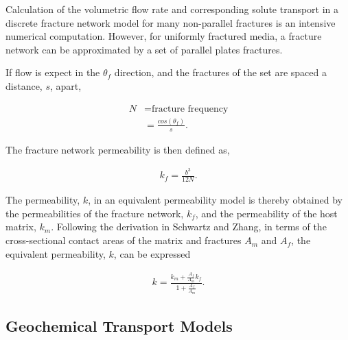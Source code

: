 Calculation of the volumetric flow rate and corresponding solute transport in a
discrete fracture network model for many non-parallel fractures is an intensive
numerical computation. However, for uniformly fractured media, a fracture
network can be approximated by a set of parallel plates fractures. 

If flow is expect in the $\theta_f$ direction, and the fractures of the set are
spaced a distance, $s$, apart,

\begin{align} 
  N &= \mbox{fracture frequency}\nonumber\\ 
  &= \frac{cos(\theta_f)}{s}.  
  \label{fracfreq} 
\end{align}

The fracture network permeability is then defined as, 

\begin{align} 
  k_f =
\frac{b^3}{12N}.  
\label{fracperm} 
\end{align}

The permeability, $k$, in an equivalent permeability model is thereby obtained
by the permeabilities of the fracture network, $k_f$, and the permeability of
the host matrix, $k_m$. Following the derivation in Schwartz and Zhang, in
terms of the cross-sectional contact areas of the matrix and fractures $A_m$
and $A_f$, the equivalent permeability, $k$, can be expressed

\begin{align} k = \frac{k_m + \frac{A_f}{A_m}k_f}{1+\frac{A_f}{A_m}}.
\label{equivperm} \end{align}

\subsection{Geochemical Transport Models}




